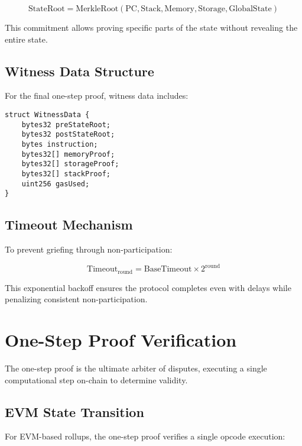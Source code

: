 \documentclass[11pt,a4paper]{article}
\theoremstyle{definition}
\begin{document}
\begin{equation}
\text{StateRoot} = \text{MerkleRoot}(\text{PC}, \text{Stack}, \text{Memory}, \text{Storage}, \text{GlobalState})
\end{equation}

This commitment allows proving specific parts of the state without revealing the entire state.

\subsection{Witness Data Structure}

For the final one-step proof, witness data includes:

\begin{lstlisting}[language=Solidity, caption=Witness Data Structure]
struct WitnessData {
    bytes32 preStateRoot;
    bytes32 postStateRoot;
    bytes instruction;
    bytes32[] memoryProof;
    bytes32[] storageProof;
    bytes32[] stackProof;
    uint256 gasUsed;
}
\end{lstlisting}

\subsection{Timeout Mechanism}

To prevent griefing through non-participation:

\begin{equation}
\text{Timeout}_{\text{round}} = \text{BaseTimeout} \times 2^{\text{round}}
\end{equation}

This exponential backoff ensures the protocol completes even with delays while penalizing consistent non-participation.

\section{One-Step Proof Verification}

The one-step proof is the ultimate arbiter of disputes, executing a single computational step on-chain to determine validity.

\subsection{EVM State Transition}

For EVM-based rollups, the one-step proof verifies a single opcode execution:
\end{document}
